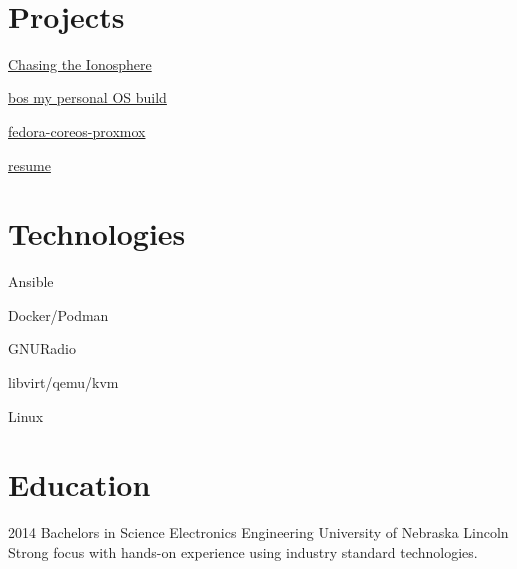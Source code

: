 \documentclass[]{src/friggeri-cv}
\begin{document}
\begin{aside}
\begin{tabular}{p{1.2cm} p{2.0cm}}
    \end{tabular}
    ~
  \section{Projects}
    \item[\rightarrow]\href{https://www.northropgrumman.com/space/chasing-the-ionosphere}{Chasing the Ionosphere}
    \item[\rightarrow]\href{https://github.com/bpbeatty/bos}{bos my personal OS build}
    \item[\rightarrow]\href{https://github.com/bpbeatty/fedora-coreos-proxmox}{fedora-coreos-proxmox}
    \item[\rightarrow]\href{https://github.com/bpbeatty/resume}{resume}
    ~
  \section{Technologies}
    \item[\rightarrow]{Ansible}
    \item[\rightarrow]{Docker/Podman}
    \item[\rightarrow]{GNURadio}
    \item[\rightarrow]{libvirt/qemu/kvm}
    \item[\rightarrow]{Linux}
    ~
\end{aside}

\section{Education}
\begin{entrylist}
  \entry
    {2014}
    {Bachelors in Science Electronics Engineering}
    {University of Nebraska Lincoln}
    {Strong focus with hands-on experience using industry standard technologies.}
\end{entrylist}
\end{document}
